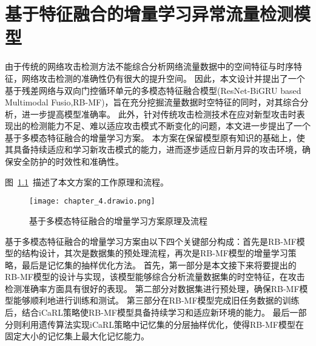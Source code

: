 \chapter{基于特征融合的增量学习异常流量检测模型}
\label{cha:ResNet-BiGRU}

由于传统的网络攻击检测方法不能综合分析网络流量数据中的空间特征与时序特征，网络攻击检测的准确性仍有很大的提升空间。
因此，本文设计并提出了一个基于残差网络与双向门控循环单元的多模态特征融合模型(ResNet-BiGRU based Multimodal Fusio,RB-MF)，旨在充分挖掘流量数据时空特征的同时，对其综合分析，进一步提高模型准确率。
此外，针对传统攻击检测技术在应对新型攻击时表现出的检测能力不足、难以适应攻击模式不断变化的问题，本文进一步提出了一个基于多模态特征融合的增量学习方案。
本方案在保留模型原有知识的基础上，使其具备持续适应和学习新攻击模式的能力，进而逐步适应日新月异的攻击环境，确保安全防护的时效性和准确性。

图~\ref{fig:attack_detecion_model}~描述了本文方案的工作原理和流程。
\begin{figure}[h]
	\centering
	\texttt{[image: chapter\_4.drawio.png]}
	\caption{基于多模态特征融合的增量学习方案原理及流程}
	\label{fig:attack_detecion_model}
\end{figure}
基于多模态特征融合的增量学习方案由以下四个关键部分构成：首先是RB-MF模型的结构设计，其次是数据集的预处理流程，再次是RB-MF模型的增量学习策略，最后是记忆集的抽样优化方法。
首先，第一部分是本文接下来将要提出的RB-MF模型的设计与实现，该模型能够综合分析流量数据集的时空特征，在攻击检测准确率方面具有很好的表现。
第二部分对数据集进行预处理，确保RB-MF模型能够顺利地进行训练和测试。
第三部分在RB-MF模型完成旧任务数据的训练后，结合iCaRL\cite{rebuffi2017icarl}策略使RB-MF模型具备持续学习和适应新环境的能力。
最后一部分则利用遗传算法实现iCaRL策略中记忆集的分层抽样优化，使得RB-MF模型在固定大小的记忆集上最大化记忆能力。

